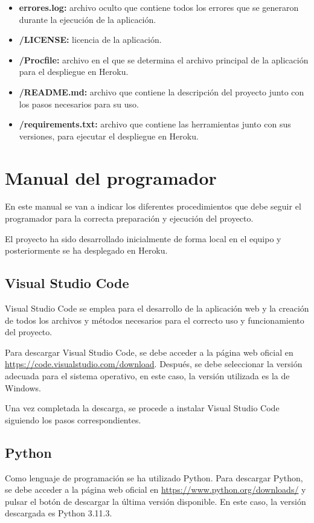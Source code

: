 \begin{itemize}
    \item \textbf{errores.log:} archivo oculto que contiene todos los errores que se generaron durante la ejecución de la aplicación.
    \item \textbf{/LICENSE:} licencia de la aplicación.
    \item \textbf{/Procfile:} archivo en el que se determina el archivo principal de la aplicación para el despliegue en Heroku. 
    \item \textbf{/README.md:} archivo que contiene la descripción del proyecto junto con los pasos necesarios para su uso.
    \item \textbf{/requirements.txt:} archivo que contiene las herramientas junto con sus versiones, para ejecutar el despliegue en Heroku.
   
\end{itemize}

\section{Manual del programador}
En este manual se van a indicar los diferentes procedimientos que debe seguir el programador para la correcta preparación y ejecución del proyecto.

El proyecto ha sido desarrollado inicialmente de forma local en el equipo y posteriormente se ha desplegado en Heroku.

\subsection{Visual Studio Code}
Visual Studio Code se emplea para el desarrollo de la aplicación web y la creación de todos los archivos y métodos necesarios para el correcto uso y funcionamiento del proyecto.

Para descargar Visual Studio Code, se debe acceder a la página web oficial en \url{https://code.visualstudio.com/download}. Después, se debe seleccionar la versión adecuada para el sistema operativo, en este caso, la versión utilizada es la de Windows.

Una vez completada la descarga, se procede a instalar Visual Studio Code siguiendo los pasos correspondientes.

\subsection{Python}
Como lenguaje de programación se ha utilizado Python. Para descargar Python, se debe acceder a la página web oficial en \url{https://www.python.org/downloads/} y pulsar el botón de descargar la última versión disponible. En este caso, la versión descargada es Python 3.11.3.

